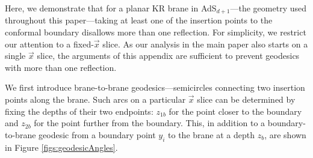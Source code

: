 \documentclass[reprint,amsmath,amssymb,aps,nofootinbib,twocolumn]{revtex4-2}
\begin{document}
\begin{appendix}
Here, we demonstrate that for a planar KR brane in AdS$_{d+1}$---the geometry used throughout this paper---taking at least one of the insertion points to the conformal boundary disallows more than one reflection. For simplicity, we restrict our attention to a fixed-$\vec{x}$ slice. As our analysis in the main paper also starts on a single $\vec{x}$ slice, the arguments of this appendix are sufficient to prevent geodesics with more than one reflection.

We first introduce brane-to-brane geodesics---semicircles connecting two insertion points along the brane. Such arcs on a particular $\vec{x}$ slice can be determined by fixing the depths of their two endpoints: $z_{1b}$ for the point closer to the boundary and $z_{2b}$ for the point further from the boundary. This, in addition to a boundary-to-brane geodesic from a boundary point $y_i$ to the brane at a depth $z_b$, are shown in Figure \ref{figs:geodesicAngles}.

\begin{figure}
\centering
{}\quad
{}
\end{figure}
\end{appendix}
\end{document}
